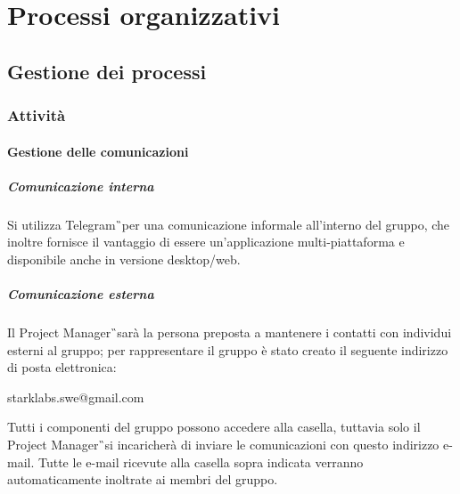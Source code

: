 \section{Processi organizzativi}
\subsection{Gestione dei processi}
\subsubsection{Attività}
\paragraph{Gestione delle comunicazioni}
\subparagraph{Comunicazione interna}
Si utilizza Telegram\G\ per una comunicazione informale all'interno del 
gruppo, che inoltre fornisce il vantaggio di essere un'applicazione 
multi-piattaforma e disponibile anche in versione desktop/web. 

\subparagraph{Comunicazione esterna}
Il Project Manager\G\ sarà la persona preposta a mantenere i contatti con 
individui esterni al gruppo; per rappresentare il gruppo è stato creato il 
seguente indirizzo di posta elettronica:
\begin{center}
	starklabs.swe@gmail.com
\end{center}
Tutti i componenti del gruppo possono accedere alla casella, tuttavia solo 
il Project Manager\G\ si incaricherà di inviare le comunicazioni con questo 
indirizzo 
e-mail. 
Tutte le e-mail ricevute alla casella sopra indicata verranno automaticamente 
inoltrate ai membri del gruppo.

